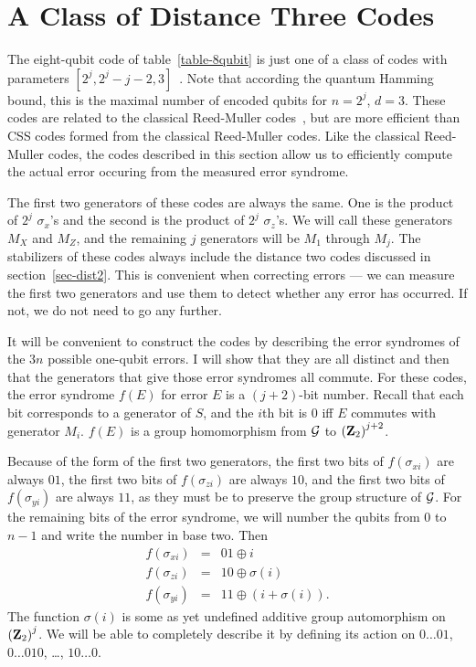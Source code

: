 \documentclass{report}
\newcommand{\G}{{\cal G}}
\newcommand{\X}{\sigma_x}
\newcommand{\Z}{\sigma_z}
\newcommand{\Xs}[1]{\sigma_{x{#1}}}
\newcommand{\Ys}[1]{\sigma_{y{#1}}}
\newcommand{\Zs}[1]{\sigma_{z{#1}}}
\begin{document}
\section{A Class of Distance Three Codes}
\label{sec-2toj}

The eight-qubit code of table~\ref{table-8qubit} is just one of a class of 
codes with parameters $[2^j, 2^j - j - 2, 3]$~\cite{gottesman-stab}.  Note 
that according the quantum Hamming bound, this is the maximal number 
of encoded qubits for $n=2^j$, $d=3$.  These codes are related to the 
classical Reed-Muller codes~\cite{steane-RM}, but are more efficient than 
CSS codes formed from the classical Reed-Muller codes.  Like the classical
Reed-Muller codes, the codes described in this section allow us to efficiently
compute the actual error occuring from the measured error syndrome.

The first two generators of these codes are always the same.  One is the 
product of $2^j$ $\X$'s and the second is the product of $2^j$ $\Z$'s.  We 
will call these generators $M_X$ and $M_Z$, and the remaining $j$ 
generators will be $M_1$ through $M_j$.  The stabilizers of these codes 
always include the distance two codes discussed in section~\ref{sec-dist2}.  
This is convenient when correcting errors --- we can measure the first two 
generators and use them to detect whether any error has occurred.  If not, 
we do not need to go any further.

It will be convenient to construct the codes by describing the error 
syndromes of the $3n$ possible one-qubit errors.  I will show that they 
are all distinct and then that the generators that give those error 
syndromes all commute.  For these codes, the error syndrome $f(E)$ for 
error $E$ is a $(j+2)$-bit number.  Recall that each bit corresponds to a 
generator of $S$, and the $i$th bit is $0$ iff $E$ commutes with generator 
$M_i$.  $f(E)$ is a group homomorphism from $\G$ to $\left({\bf Z}_2 
\right)^{j+2}$.

Because of the form of the first two generators, the first two bits of 
$f(\Xs{i})$ are always $01$, the first two bits of $f(\Zs{i})$ are always $10$, 
and the first two bits of $f(\Ys{i})$ are always $11$, as they must be to
preserve the group structure of $\G$.  For the remaining bits of the error 
syndrome, we will number the qubits from $0$ to $n-1$ and write the number in 
base two.  Then
\begin{eqnarray}
f(\Xs{i}) & = & 01 \oplus i \\
f(\Zs{i}) & = & 10 \oplus \sigma (i) \\
f(\Ys{i}) & = & 11 \oplus (i + \sigma (i)).
\end{eqnarray}
The function $\sigma(i)$ is some as yet undefined additive group 
automorphism on $\left( {\bf Z}_2 \right)^j$.  We will be able to completely 
describe it by defining its action on $0 \ldots 01$, $0 \ldots 010$, \ldots, 
$10 \ldots 0$.
\end{document}
